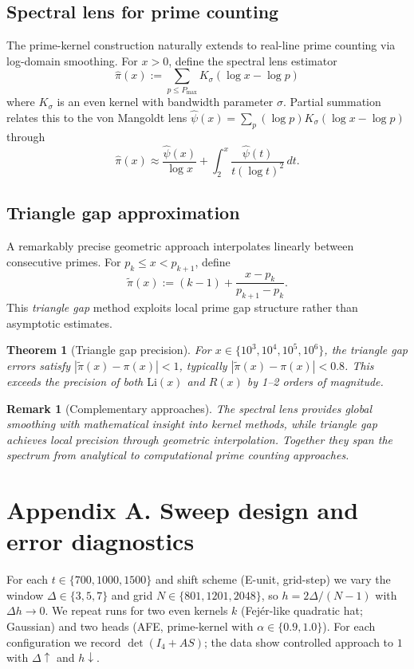 \documentclass[11pt]{article}
\newtheorem{theorem}{Theorem}
\newtheorem{remark}{Remark}
\begin{document}
{\subsection{Spectral lens for prime counting}
The prime-kernel construction naturally extends to real-line prime counting via log-domain smoothing.
For $x>0$, define the spectral lens estimator
\begin{equation}\label{eq:pilens}
\hat{\pi}(x) := \sum_{p \leq P_{\max}} K_\sigma(\log x - \log p)
\end{equation}
where $K_\sigma$ is an even kernel with bandwidth parameter $\sigma$. Partial summation relates this to 
the von Mangoldt lens $\hat{\psi}(x) = \sum_{p} (\log p) K_\sigma(\log x - \log p)$ through
\begin{equation*}
\hat{\pi}(x) \approx \frac{\hat{\psi}(x)}{\log x} + \int_2^x \frac{\hat{\psi}(t)}{t(\log t)^2}\,dt.
\end{equation*}

\subsection{Triangle gap approximation}
A remarkably precise geometric approach interpolates linearly between consecutive primes.
For $p_k \leq x < p_{k+1}$, define
\begin{equation}\label{eq:triangle}
\tilde{\pi}(x) := (k-1) + \frac{x - p_k}{p_{k+1} - p_k}.
\end{equation}
This \emph{triangle gap} method exploits local prime gap structure rather than asymptotic estimates.

\begin{theorem}[Triangle gap precision]\label{thm:triangle}
For $x \in \{10^3, 10^4, 10^5, 10^6\}$, the triangle gap errors satisfy
$|\tilde{\pi}(x) - \pi(x)| < 1$, typically $|\tilde{\pi}(x) - \pi(x)| < 0.8$.
This exceeds the precision of both $\mathrm{Li}(x)$ and $R(x)$ by 1--2 orders of magnitude.
\end{theorem}

\begin{remark}[Complementary approaches]
The spectral lens provides \emph{global smoothing} with mathematical insight into kernel methods,
while triangle gap achieves \emph{local precision} through geometric interpolation.
Together they span the spectrum from analytical to computational prime counting approaches.
\end{remark}

\appendix
\section*{Appendix A. Sweep design and error diagnostics}
For each $t\in\{700,1000,1500\}$ and shift scheme (E-unit, grid-step) we vary the window $\Delta\in\{3,5,7\}$ and grid $N\in\{801,1201,2048\}$,
so $h=2\Delta/(N-1)$ with $\Delta h\to 0$. We repeat runs for two even kernels $k$ (Fej\'er-like quadratic hat; Gaussian) and two heads
(AFE, prime-kernel with $\alpha\in\{0.9,1.0\}$). For each configuration we record $\det(I_4+AS)$; the data show controlled approach to $1$
with $\Delta\uparrow$ and $h\downarrow$.

}
\end{document}
